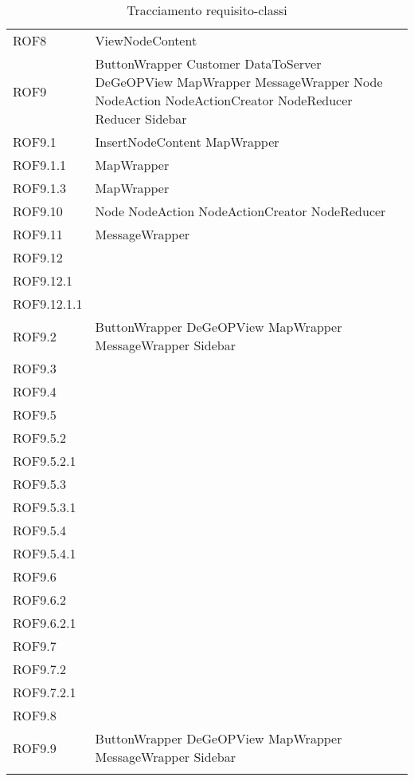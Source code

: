 \begin{longtable}{p{2.5cm}!{\VRule[1pt]}p{5cm}}
	ROF8 & ViewNodeContent\\
	ROF9 & ButtonWrapper \newline Customer \newline DataToServer \newline DeGeOPView \newline MapWrapper \newline MessageWrapper \newline Node \newline NodeAction \newline NodeActionCreator \newline NodeReducer \newline Reducer \newline Sidebar\\
	ROF9.1 & InsertNodeContent \newline MapWrapper\\
	ROF9.1.1 & MapWrapper\\
	ROF9.1.3 & MapWrapper\\
	ROF9.10 & Node \newline NodeAction \newline NodeActionCreator \newline NodeReducer\\
	ROF9.11 & MessageWrapper\\
	ROF9.12 & \\
	ROF9.12.1 & \\
	ROF9.12.1.1 & \\
	ROF9.2 & ButtonWrapper \newline DeGeOPView \newline MapWrapper \newline MessageWrapper \newline Sidebar\\
	ROF9.3 & \\
	ROF9.4 & \\
	ROF9.5 & \\
	ROF9.5.2 & \\
	ROF9.5.2.1 & \\
	ROF9.5.3 & \\
	ROF9.5.3.1 & \\
	ROF9.5.4 & \\
	ROF9.5.4.1 & \\
	ROF9.6 & \\
	ROF9.6.2 & \\
	ROF9.6.2.1 & \\
	ROF9.7 & \\
	ROF9.7.2 & \\
	ROF9.7.2.1 & \\
	ROF9.8 & \\
	ROF9.9 & ButtonWrapper \newline DeGeOPView \newline MapWrapper \newline MessageWrapper \newline Sidebar\\
	\caption{Tracciamento requisito-classi}
\end{longtable}

